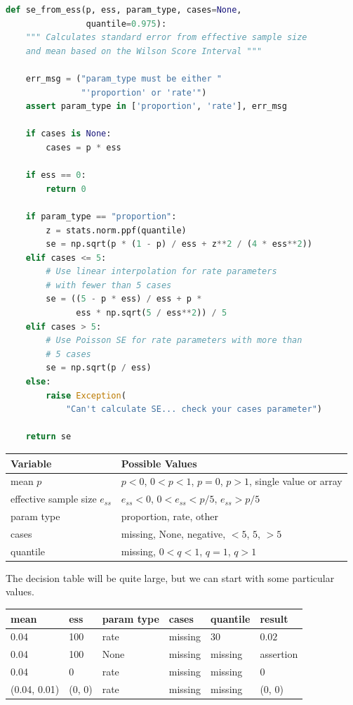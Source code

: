 \documentclass[fleqn,10pt]{olplainarticle}
\begin{document}
\begin{lstlisting}[language=Python]
def se_from_ess(p, ess, param_type, cases=None,
                quantile=0.975):
    """ Calculates standard error from effective sample size
    and mean based on the Wilson Score Interval """

    err_msg = ("param_type must be either "
               "'proportion' or 'rate'")
    assert param_type in ['proportion', 'rate'], err_msg

    if cases is None:
        cases = p * ess

    if ess == 0:
        return 0

    if param_type == "proportion":
        z = stats.norm.ppf(quantile)
        se = np.sqrt(p * (1 - p) / ess + z**2 / (4 * ess**2))
    elif cases <= 5:
        # Use linear interpolation for rate parameters
        # with fewer than 5 cases
        se = ((5 - p * ess) / ess + p *
              ess * np.sqrt(5 / ess**2)) / 5
    elif cases > 5:
        # Use Poisson SE for rate parameters with more than
        # 5 cases
        se = np.sqrt(p / ess)
    else:
        raise Exception(
            "Can't calculate SE... check your cases parameter")

    return se
\end{lstlisting}

\begin{center}
    \begin{tabular}{ll}
    \hline
    Variable & Possible Values \\ \hline
    mean $p$ & $p<0$, $0<p<1$, $p=0$, $p>1$, single value or array \\
    effective sample size $e_{ss}$ & $e_{ss} <0$, $0<e_{ss}<p/5$, $e_{ss}>p/5$ \\
    param type & proportion, rate, other \\
    cases & missing, None, negative, $<5$, $5$, $>5$ \\
    quantile & missing, $0<q<1$, $q=1$, $q>1$ \\ \hline
    \end{tabular}
\end{center}
The decision table will be quite large, but we can start with some
particular values.
\begin{center}
    \begin{tabular}{llllll}
    \hline
    mean & ess & param type & cases & quantile & result \\ \hline
    0.04 & 100 & rate & missing & 30 & $0.02$ \\
    0.04 & 100 & None & missing & missing & assertion \\
    0.04 & 0 & rate & missing & missing & 0 \\
    (0.04, 0.01) & (0, 0) & rate & missing & missing & (0, 0)
\end{tabular}
\end{center}
\end{document}
